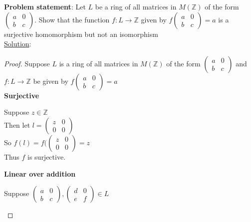 \documentclass{article} %
\begin{document}
\textbf{Problem statement}: Let $L$ be a ring of all matrices in $M(\mathbb{Z})$ of the form $\left( \begin{smallmatrix} a & 0 \\ b & c \end{smallmatrix} \right)$.  Show that the function $f:L\rightarrow \mathbb{Z}$ given by $f\left( \begin{smallmatrix} a & 0 \\ b & c \end{smallmatrix} \right) = a$ is a surjective homomorphism but not an isomorphism
\\

\underline{Solution}: 
\begin{addmargin}[1em]{0em}
\begin{proof} \hfill \break
Suppose $L$ is a ring of all matrices in $M(\mathbb{Z})$ of the form $\left( \begin{smallmatrix} a & 0 \\ b & c \end{smallmatrix} \right)$ and $f:L \rightarrow \mathbb{Z}$ be given by $f\left( \begin{smallmatrix} a & 0 \\ b & c \end{smallmatrix} \right) = a$
\\ \textbf{Surjective}
\begin{addmargin}[1em]{0em}
Suppose $z \in \mathbb{Z}$
\\Then let $l = \left( \begin{smallmatrix} z & 0 \\ 0 & 0 \end{smallmatrix} \right)$
\\So $f(l) = f(\left( \begin{smallmatrix} z & 0 \\ 0 & 0 \end{smallmatrix} \right) = z$
\\Thus $f$ is surjective.
\end{addmargin}
\textbf{Linear over addition}
\begin{addmargin}[1em]{0em}
Suppose $ \left( \begin{smallmatrix} a & 0 \\ b & c \end{smallmatrix} \right),  \left( \begin{smallmatrix} d & 0 \\ e & f \end{smallmatrix} \right) \in L$

\end{addmargin}
\end{proof}
\end{addmargin}
\end{document}
